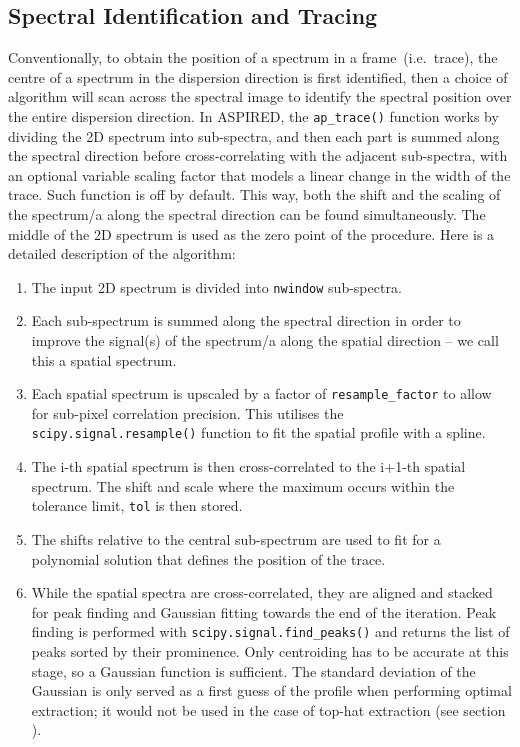 \documentclass[twocolumn, linenumbers]{aastex631}
\begin{document}
\subsection{Spectral Identification and Tracing}
\label{sec:tracing}
Conventionally, to obtain the position of a spectrum in a frame~(i.e.\ trace),
the centre of a spectrum in the dispersion direction is first identified,
then a choice of algorithm will scan across the spectral image to identify
the spectral position over the entire dispersion direction. In \textsc{ASPIRED},
the \texttt{ap\_trace()} function works by dividing the 2D spectrum into
sub-spectra, and then each part is summed along the spectral direction before
cross-correlating with the adjacent sub-spectra, with an optional variable scaling
factor that models a linear change in the width of the trace. Such function is
off by default. This way, both the shift and the scaling of the spectrum/a along the
spectral direction can be found simultaneously. The middle of the
2D spectrum is used as the zero point of the procedure. Here is a
detailed description of the algorithm:
\begin{enumerate}
    \item
        The input 2D spectrum is divided into \texttt{nwindow}
        sub-spectra.
    \item
        Each sub-spectrum is summed along the spectral direction
        in order to improve the signal(s) of the spectrum/a along
        the spatial direction – we call this a spatial spectrum.
    \item
        Each spatial spectrum is upscaled by a factor of
        \texttt{resample\_factor} to allow for sub-pixel correlation
        precision. This utilises the \texttt{scipy.signal.resample()}
        function to fit the spatial profile with a spline.
    \item
        The i-th spatial spectrum is then cross-correlated to the i+1-th
        spatial spectrum. The shift and scale where the maximum
        occurs within the tolerance limit, \texttt{tol} is then stored.
    \item
        The shifts relative to the central sub-spectrum are used to
        fit for a polynomial solution that defines the position of
        the trace.
    \item
        While the spatial spectra are cross-correlated, they
        are aligned and stacked for peak finding and Gaussian fitting
        towards the end of the iteration. Peak finding is performed with
        \texttt{scipy.signal.find\_peaks()} and returns the list of
        peaks sorted by their prominence. Only centroiding has to be
        accurate at this stage, so a Gaussian function is sufficient.
        The standard deviation of the Gaussian is only served as a
        first guess of the profile when performing optimal extraction;
        it would not be used in the case of top-hat extraction (see
        section ).
\end{enumerate}
\end{document}
